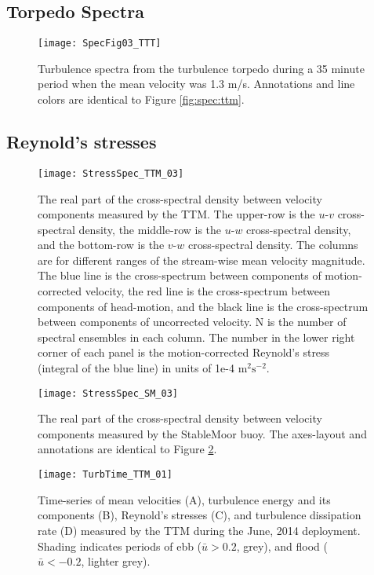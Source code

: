 \subsection{Torpedo Spectra}

\begin{figure}[t]
  \centering
  \texttt{[image: SpecFig03\_TTT]}
  \caption{Turbulence spectra from the turbulence torpedo during a 35 minute period when the mean velocity was 1.3 m/s. Annotations and line colors are identical to Figure \ref{fig:spec:ttm}.}
  \label{fig:spec:ttt}
\end{figure}

\subsection{Reynold's stresses}

\begin{figure*}[t]
  \centering
  \texttt{[image: StressSpec\_TTM\_03]}
  \caption{The real part of the cross-spectral density between velocity components measured by the TTM. The upper-row is the $u$-$v$ cross-spectral density, the middle-row is the $u$-$w$ cross-spectral density, and the bottom-row is the $v$-$w$ cross-spectral density.  The columns are for different ranges of the stream-wise mean velocity magnitude. The blue line is the cross-spectrum between components of motion-corrected velocity, the red line is the cross-spectrum between components of head-motion, and the black line is the cross-spectrum between components of uncorrected velocity. N is the number of spectral ensembles in each column. The number in the lower right corner of each panel is the motion-corrected Reynold's stress (integral of the blue line) in units of 1e-4 $\mathrm{m^2s^{-2}}$.}
  \label{fig:stressspec:ttm}
\end{figure*}

\begin{figure*}[t]
  \centering
  \texttt{[image: StressSpec\_SM\_03]}
  \caption{The real part of the cross-spectral density between velocity components measured by the StableMoor buoy. The axes-layout and annotations are identical to Figure \ref{fig:stressspec:ttm}.}
  \label{fig:stressspec:sm}
\end{figure*}


\begin{figure*}[t]
  \centering
  \texttt{[image: TurbTime\_TTM\_01]}
  \caption{Time-series of mean velocities (A), turbulence energy and its components (B), Reynold's stresses (C), and turbulence dissipation rate (D) measured by the TTM during the June, 2014 deployment. Shading indicates periods of ebb ($\bar{u}>0.2$, grey), and flood ($\bar{u}<-0.2$, lighter grey).}
  \label{fig:turbtime:ttm}
\end{figure*}




